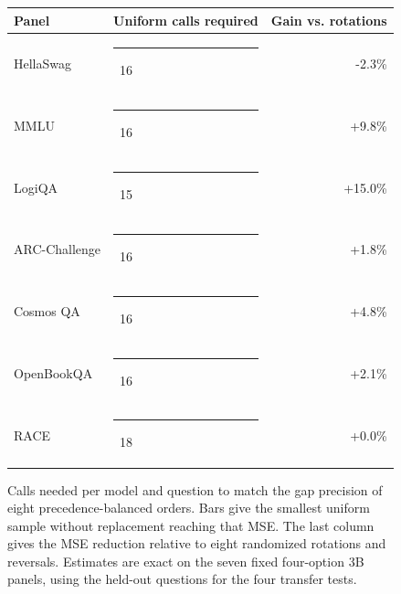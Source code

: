 \begin{figure}[t]
\centering\small
\begin{tabular}{@{}l@{\quad}l@{\quad}r@{}}
Panel & Uniform calls required & Gain vs. rotations \\
\midrule
HellaSwag & \rule{48pt}{4pt}\ 16 & -2.3\% \\
MMLU & \rule{48pt}{4pt}\ 16 & +9.8\% \\
LogiQA & \rule{45pt}{4pt}\ 15 & +15.0\% \\
ARC-Challenge & \rule{48pt}{4pt}\ 16 & +1.8\% \\
Cosmos QA & \rule{48pt}{4pt}\ 16 & +4.8\% \\
OpenBookQA & \rule{48pt}{4pt}\ 16 & +2.1\% \\
RACE & \rule{54pt}{4pt}\ 18 & +0.0\% \\
\bottomrule
\end{tabular}
\caption{Calls needed per model and question to match the gap precision of eight precedence-balanced orders. Bars give the smallest uniform sample without replacement reaching that MSE. The last column gives the MSE reduction relative to eight randomized rotations and reversals. Estimates are exact on the seven fixed four-option 3B panels, using the held-out questions for the four transfer tests.}
\label{fig:cost}
\end{figure}
